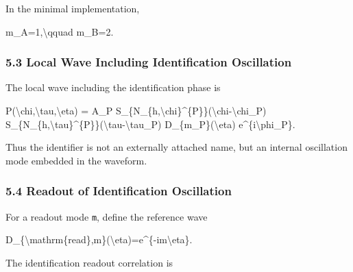 \documentclass[
  a4paper,
]{article}
\newenvironment{Shaded}{}{}
\newcommand{\NormalTok}[1]{#1}
\begin{document}
In the minimal implementation,

\begin{Shaded}
\begin{Highlighting}[]
\NormalTok{m\_A=1,\textbackslash{}qquad m\_B=2.}
\end{Highlighting}
\end{Shaded}

\subsubsection{5.3 Local Wave Including Identification
Oscillation}\label{local-wave-including-identification-oscillation}

The local wave including the identification phase is

\begin{Shaded}
\begin{Highlighting}[]
\NormalTok{P(\textbackslash{}chi,\textbackslash{}tau,\textbackslash{}eta)}
\NormalTok{=}
\NormalTok{A\_P}
\NormalTok{S\_\{N\_\{h,\textbackslash{}chi\}\^{}\{P\}\}(\textbackslash{}chi{-}\textbackslash{}chi\_P)}
\NormalTok{S\_\{N\_\{h,\textbackslash{}tau\}\^{}\{P\}\}(\textbackslash{}tau{-}\textbackslash{}tau\_P)}
\NormalTok{D\_\{m\_P\}(\textbackslash{}eta)}
\NormalTok{e\^{}\{i\textbackslash{}phi\_P\}.}
\end{Highlighting}
\end{Shaded}

Thus the identifier is not an externally attached name, but an internal
oscillation mode embedded in the waveform.

\subsubsection{5.4 Readout of Identification
Oscillation}\label{readout-of-identification-oscillation}

For a readout mode \texttt{m}, define the reference wave

\begin{Shaded}
\begin{Highlighting}[]
\NormalTok{D\_\{\textbackslash{}mathrm\{read\},m\}(\textbackslash{}eta)=e\^{}\{{-}im\textbackslash{}eta\}.}
\end{Highlighting}
\end{Shaded}

The identification readout correlation is
\end{document}
